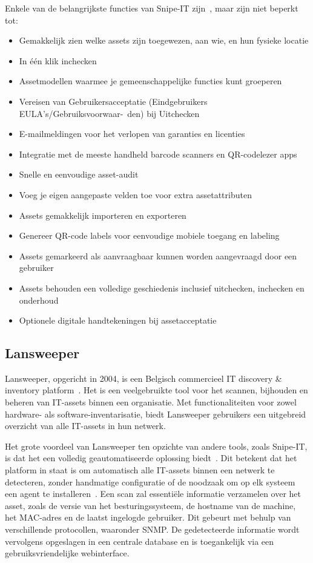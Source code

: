 Enkele van de belangrijkste functies van Snipe-IT zijn~\autocite{snipe-it-features}, maar zijn niet beperkt tot:
\begin{itemize}
    \item Gemakkelijk zien welke assets zijn toegewezen, aan wie, en hun fysieke locatie
    \item In één klik inchecken
    \item Assetmodellen waarmee je gemeenschappelijke functies kunt groeperen
    \item Vereisen van Gebruikersacceptatie (Eindgebruikers EULA's/Gebruiksvoorwaar-\ den) bij Uitchecken
    \item E-mailmeldingen voor het verlopen van garanties en licenties
    \item Integratie met de meeste handheld barcode scanners en QR-codelezer apps
    \item Snelle en eenvoudige asset-audit
    \item Voeg je eigen aangepaste velden toe voor extra assetattributen
    \item Assets gemakkelijk importeren en exporteren
    \item Genereer QR-code labels voor eenvoudige mobiele toegang en labeling
    \item Assets gemarkeerd als aanvraagbaar kunnen worden aangevraagd door een gebruiker
    \item Assets behouden een volledige geschiedenis inclusief uitchecken, inchecken en onderhoud
    \item Optionele digitale handtekeningen bij assetacceptatie
\end{itemize}

\subsection{Lansweeper}
\label{sub:lansweeper}

Lansweeper, opgericht in 2004, is een Belgisch commercieel IT discovery \& inventory platform~\autocite{lansweeper-history}.
Het is een veelgebruikte tool voor het scannen, bijhouden en beheren van IT-assets binnen een organisatie.
Met functionaliteiten voor zowel hardware- als software-inventarisatie, biedt Lansweeper gebruikers een uitgebreid overzicht van alle IT-assets in hun netwerk.

Het grote voordeel van Lansweeper ten opzichte van andere tools, zoals Snipe-IT, is dat het een volledig geautomatiseerde oplossing biedt~\autocite{lansweeper-features}.
Dit betekent dat het platform in staat is om automatisch alle IT-assets binnen een netwerk te detecteren, zonder handmatige configuratie of de noodzaak om op elk systeem een agent te installeren~\autocite{lansweeper-getting-started}.
Een scan zal essenti\"ele informatie verzamelen over het asset, zoals de versie van het besturingssysteem, de hostname van de machine, het MAC-adres en de laatst ingelogde gebruiker.
Dit gebeurt met behulp van verschillende protocollen, waaronder SNMP.
De gedetecteerde informatie wordt vervolgens opgeslagen in een centrale database en is toegankelijk via een gebruiksvriendelijke webinterface.

